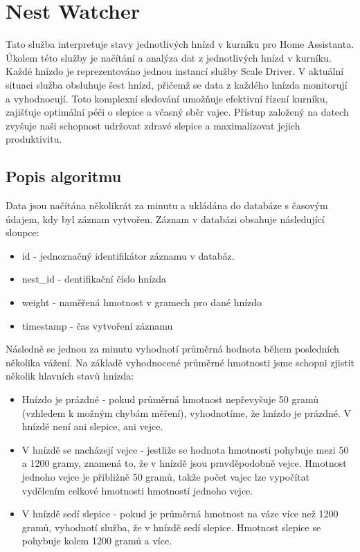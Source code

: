\section{Nest Watcher}\label{sec:nest-watcher}
Tato služba interpretuje stavy jednotlivých hnízd v kurníku pro Home Assistanta.
Úkolem této služby je načítání a analýza dat z jednotlivých hnízd v kurníku.
Každé hnízdo je reprezentováno jednou instancí služby Scale Driver.\newline
V aktuální situaci služba obsluhuje šest hnízd, přičemž se data z každého hnízda monitorují a vyhodnocují.
Toto komplexní sledování umožňuje efektivní řízení kurníku, zajišťuje optimální péči o slepice a včasný sběr vajec.
Přístup založený na datech zvyšuje naši schopnost udržovat zdravé slepice a maximalizovat jejich produktivitu.\newline

\subsection*{Popis algoritmu}

Data jsou načítána několikrát za minutu a ukládána do databáze s časovým údajem, kdy byl záznam vytvořen.
Záznam v databázi obsahuje následující sloupce:

\begin{itemize}
    \item id - jednoznačný identifikátor záznamu v databáz.
    \item nest\_id - dentifikační číslo hnízda
    \item weight - naměřená hmotnost v gramech pro dané hnízdo
    \item timestamp - čas vytvoření záznamu
\end{itemize}

Následně se jednou za minutu vyhodnotí průměrná hodnota během posledních několika vážení.
Na základě vyhodnocené průměrné hmotnosti jsme schopni zjistit několik hlavních stavů hnízda:

\begin{itemize}
    \item Hnízdo je prázdné - pokud průměrná hmotnost nepřevyšuje 50 gramů (vzhledem k možným chybám měření), vyhodnotíme, že hnízdo je prázdné.
    V hnízdě není ani slepice, ani vejce.
    \item V hnízdě se nacházejí vejce - jestliže se hodnota hmotnosti pohybuje mezi 50 a 1200 gramy, znamená to, že v hnízdě jsou pravděpodobně vejce.
    Hmotnost jednoho vejce je přibližně 50 gramů, takže počet vajec lze vypočítat vydělením celkové hmotnosti hmotností jednoho vejce.
    \item V hnízdě sedí slepice - pokud je průměrná hmotnost na váze více než 1200 gramů, vyhodnotí služba, že v hnízdě sedí slepice.
    Hmotnost slepice se pohybuje kolem 1200 gramů a více.
\end{itemize}

